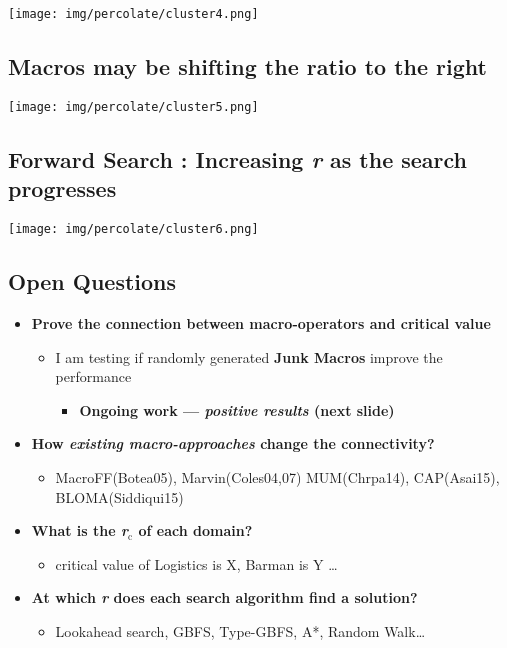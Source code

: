 \texttt{[image: img/percolate/cluster4.png]}

\subsection{Macros may be shifting the ratio to the right}
\label{sec-15-8}

\texttt{[image: img/percolate/cluster5.png]}

\subsection{Forward Search : Increasing \emph{r} as the search progresses}
\label{sec-15-9}

\texttt{[image: img/percolate/cluster6.png]}

\subsection{Open Questions}
\label{sec-15-10}

\begin{itemize}
\item \textbf{Prove the connection between macro-operators and critical value}
\begin{itemize}
\item I am testing if randomly generated \textbf{Junk Macros} improve the performance
\begin{itemize}
\item \textbf{Ongoing work --- \emph{positive results} (next slide)}
\end{itemize}
\end{itemize}
\item \textbf{How \emph{existing macro-approaches} change the connectivity?}
\begin{itemize}
\item MacroFF(Botea05), Marvin(Coles04,07) MUM(Chrpa14), CAP(Asai15), BLOMA(Siddiqui15)
\end{itemize}
\item \textbf{What is the \emph{r$_{\text{c}}$} of each domain?}
\begin{itemize}
\item critical value of Logistics is X, Barman is Y \ldots{}
\end{itemize}
\item \textbf{At which \emph{r} does each search algorithm find a solution?}
\begin{itemize}
\item Lookahead search, GBFS, Type-GBFS, A*, Random Walk\ldots{}
\end{itemize}
\end{itemize}

